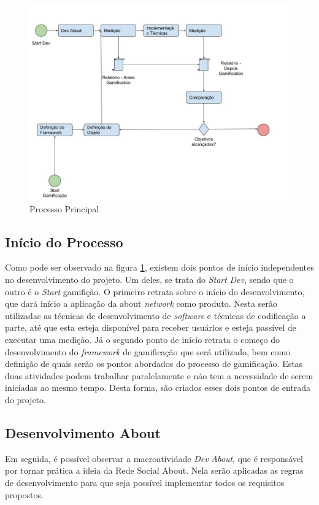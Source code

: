 \begin{figure}[h]
    \centering
    \includegraphics[width=450px, scale=1]{figuras/mainprocess}
    \caption{Processo Principal}
    \label{fig:mainprocess}
\end{figure}

\subsection{Início do Processo}
\label{sub:initialprocess}
Como pode ser observado na figura \ref{fig:mainprocess}, existem dois pontos
de início independentes no desenvolvimento do projeto. Um deles, se trata do
\textit{Start} \textit{Dev}, sendo que o outro é o \textit{Start} gamifição. O primeiro retrata sobre
o início do desenvolvimento, que dará início a aplicação da about \textit{network}
como produto. Nesta serão utilizadas as técnicas de desenvolvimento de \textit{software}
e técnicas de codificação a parte, até que esta esteja disponível para receber
usuários e esteja passível de executar uma medição. Já o segundo ponto de início
retrata o começo do desenvolvimento do \textit{framework} de gamificação que será utilizado,
bem como definição de quais serão os pontos abordados do processo de gamificação.
Estas duas atividades podem trabalhar paralelamente e não tem a necessidade de
serem iniciadas ao mesmo tempo. Desta forma, são criados esses dois pontos de
entrada do projeto.

\subsection{Desenvolvimento About}
\label{sub:Desenvolvimentoabout}
Em seguida, é possível observar a macroatividade \textit{Dev} \textit{About}, que é responsável
por tornar prática a ideia da Rede Social About. Nela serão aplicadas as
regras de desenvolvimento para que seja possível implementar todos os
requisitos propostos.

